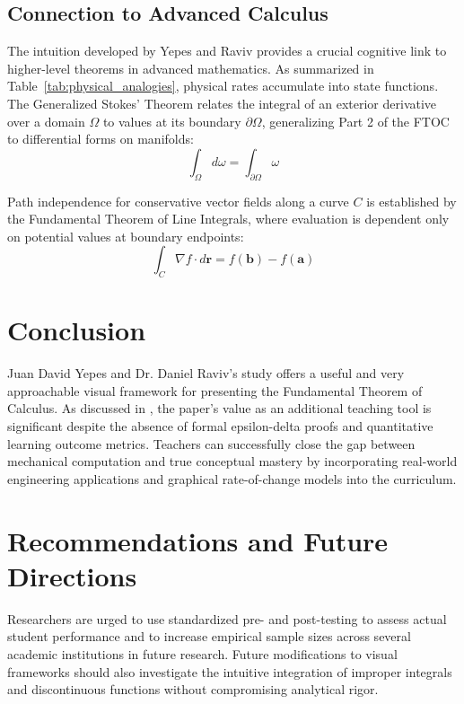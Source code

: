 \documentclass[11pt, a4paper]{article}
\begin{document}
\subsection{Connection to Advanced Calculus}
\label{subsec:advanced_calculus}
The intuition developed by Yepes and Raviv \cite{Yepes2024} provides a crucial cognitive link to higher-level theorems in advanced mathematics. As summarized in Table~\ref{tab:physical_analogies}, physical rates accumulate into state functions. The Generalized Stokes' Theorem relates the integral of an exterior derivative over a domain $\Omega$ to values at its boundary $\partial\Omega$, generalizing Part 2 of the FTOC to differential forms on manifolds:
\begin{equation}
\label{eq:generalized_stokes}
\int_{\Omega} d\omega = \int_{\partial\Omega} \omega
\end{equation}

Path independence for conservative vector fields along a curve $C$ is established by the Fundamental Theorem of Line Integrals, where evaluation is dependent only on potential values at boundary endpoints:
\begin{equation}
\label{eq:line_integral}
\int_{C} \nabla f \cdot d\mathbf{r} = f(\mathbf{b}) - f(\mathbf{a})
\end{equation}

\section{Conclusion}
\label{sec:conclusion}
Juan David Yepes and Dr. Daniel Raviv's study offers a useful and very approachable visual framework for presenting the Fundamental Theorem of Calculus. As discussed in , the paper's value as an additional teaching tool is significant despite the absence of formal epsilon-delta proofs and quantitative learning outcome metrics. Teachers can successfully close the gap between mechanical computation and true conceptual mastery by incorporating real-world engineering applications and graphical rate-of-change models into the curriculum.

\section{Recommendations and Future Directions}
\label{sec:recommendations}
Researchers are urged to use standardized pre- and post-testing to assess actual student performance and to increase empirical sample sizes across several academic institutions in future research. Future modifications to visual frameworks should also investigate the intuitive integration of improper integrals and discontinuous functions without compromising analytical rigor.
\end{document}

